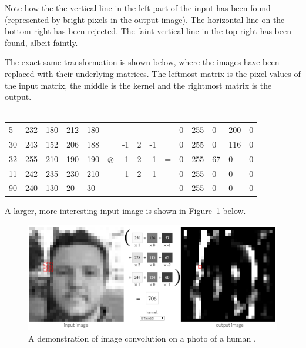 Note how the the vertical line in the left part of the input has been found (represented by bright pixels in the output image). The horizontal line on the bottom right has been rejected. The faint vertical line in the top right has been found, albeit faintly.

The exact same transformation is shown below, where the images have been replaced with their underlying matrices. The leftmost matrix is the pixel values of the input matrix, the middle is the kernel and the rightmost matrix is the output. \\ \\

\begin{table}[h!]
	\centering
	\begin{tabular}{ p{0.5cm} p{0.5cm} p{0.5cm} p{0.5cm} p{0.5cm} p{0.5cm} p{0.5cm} p{0.5cm} p{0.5cm} p{0.5cm} p{0.5cm} p{0.5cm} p{0.5cm} p{0.5cm} p{0.5cm}}
 5 & 232 & 180 & 212 & 180 &           &    &   &    &   & 0 & 255 & 0 & 200 & 0 \\
30 & 243 & 152 & 206 & 188 &           & -1 & 2 & -1 &   & 0 & 255 & 0 & 116 & 0 \\
32 & 255 & 210 & 190 & 190 & $\otimes$ & -1 & 2 & -1 & = & 0 & 255 & 67 & 0  & 0 \\
11 & 242 & 235 & 230 & 210 &           & -1 & 2 & -1 &   & 0 & 255 & 0 &  0  & 0 \\
90 & 240 & 130 &  20 &  30 &           &    &   &    &   & 0 & 255 & 0 &  0  & 0
	\end{tabular}
\end{table}

A larger, more interesting input image is shown in Figure~\ref{fig:image_kernel_demo} below.


\begin{figure}[h!]
  \centering
  \includegraphics[width=\textwidth]{literature_review/image_kernel_demo}
  \caption{\label{fig:image_kernel_demo}A demonstration of image convolution on a photo of a human \cite{website:setosa_kernel}.}
\end{figure}


